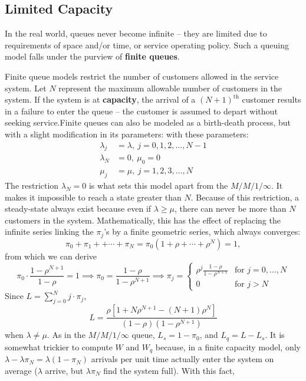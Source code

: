 \subsection{Limited Capacity}
In the real world, queues never become infinite -- they are limited due to requirements of {space} and/or {time}, or service operating policy. Such a queuing model falls under the purview of \textbf{finite queues}. \par Finite queue models restrict the number of customers allowed in the service system. Let $N$ represent the maximum allowable number of customers in the system. If the system is at \textbf{capacity}, the arrival of a $(N+1)^{\textrm{th}}$ customer results in a failure to enter the queue -- the customer is assumed to depart without seeking service.\newl Finite queues can also be modeled as a birth-death process, but with a slight modification in its parameters:  with these parameters:
\begin{align*}
\lambda_{j} &= \lambda, \ j=0,1,2,\ldots,N-1 \\ 
\lambda_{N} &= 0,\ \mu_{0} = 0 \\
\mu_{j} &= \mu,\  j=1,2,3,\ldots, N 
\end{align*}
The restriction $\lambda_{N} = 0$ is what sets this model apart from the $M/M/1/\infty$. It makes it impossible to reach a state greater than $N$. Because of this restriction, a steady-state always exist because even if $\lambda \geq \mu$, there can never be more than $N$ customers in the system.
\newl Mathematically, this has the effect of replacing the infinite series linking the $\pi_j$'s by a finite geometric series, which always converges: 
$$ \pi_{0}+\pi_1 + +\cdots + \pi_N = \pi_0(1+\rho+\cdots +\rho^{N}) = 1,$$ from which we can derive $$\pi_{0}\cdot \frac{1-\rho^{N+1}}{1-\rho} = 1 \implies \pi_0 = \frac{1-\rho}{1-\rho^{N+1}} \implies \pi_{j} = \begin{cases}\rho^{j} \frac{1-\rho}{1-\rho^{N+1}} & \text{for $j=0,\ldots,N$} \\ 0 & \text{for $j>N$}\end{cases}$$ 
Since $L = \sum^{N}_{j=0} j\cdot \pi_{j}$, 
$$L = \frac{\rho [1+ N \rho^{N+1} - (N+1) \rho^{N} ]}{(1-\rho)\left(1-\rho^{N+1}\right)} $$
when $\lambda\neq\mu$. \newl As in the $M/M/1/\infty$ queue, $L_{s} = 1 - \pi_{0}$, and $L_{q} = L - L_{s}$.  It is somewhat trickier to compute $W$ and $W_{q}$ because, in a finite capacity model, only $\lambda - \lambda \pi_{N} = \lambda\left(1-\pi_{N}\right)$ arrivals per unit time  actually enter the system on average ($\lambda$ arrive, but $\lambda\pi_N$ find the system full). With this fact, 
